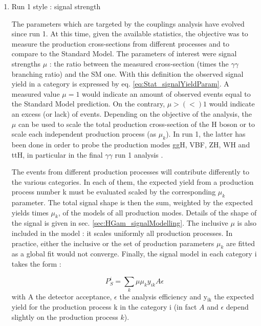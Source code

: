 \begin{enumerate}
\item Run 1 style : signal strength
\label{sec:org84ab396}
\label{sec:HGam_signalStrength}

The parameters which are targeted by the couplings analysis have evolved since run 1.
At this time, given the available statistics, the objective was to measure the production cross-sections from different processes and to compare to the Standard Model.
The parameters of interest were signal strengths $\mu$ : the ratio between the measured cross-section (times the \(\gamma\gamma\) branching ratio) and the SM one.
With this definition the observed signal yield in a category is expressed by eq. \ref{eq:Stat_signalYieldParam}.
A measured value $\mu=1$ would indicate an amount of observed events equal to the Standard Model prediction.
On the contrary, $\mu>(<)1$ would indicate an excess (or lack) of events.
Depending on the objective of the analysis, the $\mu$ can be used to scale the total production cross-section of the H boson or to scale each independent production process (as $\mu_k$).
In run 1, the latter has been done in order to probe the production modes ggH, VBF, ZH, WH and ttH, in particular in the final \(\gamma\gamma\) run 1 analysis \cite{CERN-PH-EP-2014-198}.


The events from different production processes will contribute differently to the various categories.
In each of them, the expected yield from a production process number k must be evaluated scaled by the corresponding $\mu_k$ parameter.
The total signal shape is then the sum, weighted by the expected yields times $\mu_k$, of the models of all production modes.
Details of the shape of the signal is given in sec. \ref{sec:HGam_signalModelling}.
The inclusive $\mu$ is also included in the model : it scales uniformly all production processes.
In practice, either the inclusive or the set of production parameters $\mu_k$ are fitted as a global fit would not converge.
Finally, the signal model in each category i takes the form :

\begin{equation}
  P_S^i = \sum\limits_{k} \mu \mu_{k} y_{ik} A \epsilon
  \label{eq:Stat_signalYieldParam}
\end{equation}
with A the detector acceptance, \(\epsilon\) the analysis efficiency and y\(_{\text{ik}}\) the expected yield for the production process k in the category i (in fact $A$ and $\epsilon$ depend slightly on the production process $k$).


\end{enumerate}
